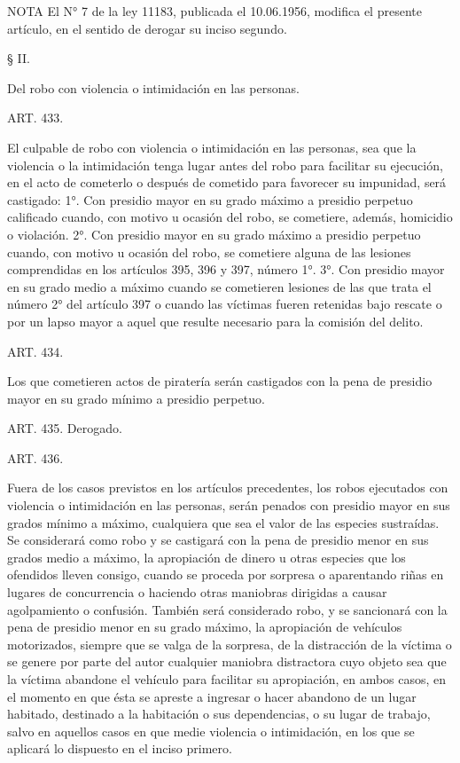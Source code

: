 NOTA
      El N° 7 de la ley 11183, publicada el 10.06.1956, modifica el presente artículo, en el sentido de derogar su inciso segundo.

    § II.

    Del robo con violencia o intimidación en las personas.




    ART. 433.

    El culpable de robo con violencia o intimidación en las personas, sea que la violencia o la intimidación tenga lugar antes del robo para facilitar su ejecución, en el acto de cometerlo o después de cometido para favorecer su impunidad, será castigado:
    1°. Con presidio mayor en su grado máximo a presidio perpetuo calificado cuando, con motivo u ocasión del robo, se cometiere, además, homicidio o violación.
    2°. Con presidio mayor en su grado máximo a presidio perpetuo cuando, con motivo u ocasión del robo, se cometiere alguna de las lesiones comprendidas en los artículos 395, 396 y 397, número 1°.
    3°. Con presidio mayor en su grado medio a máximo cuando se cometieren lesiones de las que trata el número 2° del artículo 397 o cuando las víctimas fueren retenidas bajo rescate o por un lapso mayor a aquel que resulte necesario para la comisión del delito.

    ART. 434.

    Los que cometieren actos de piratería serán castigados con la pena de presidio mayor en su grado mínimo a presidio perpetuo.





    ART. 435.    Derogado.

    ART. 436.

    Fuera de los casos previstos en los artículos precedentes, los robos ejecutados con violencia o intimidación en las personas, serán penados con presidio mayor en sus grados mínimo a máximo, cualquiera que sea el valor de las especies sustraídas.
    Se considerará como robo y se castigará con la pena de presidio menor en sus grados medio a máximo, la apropiación de dinero u otras especies que los ofendidos lleven consigo, cuando se proceda por sorpresa o aparentando riñas en lugares de concurrencia o haciendo otras maniobras dirigidas a causar agolpamiento o confusión.
    También será considerado robo, y se sancionará con la pena de presidio menor en su grado máximo, la apropiación de vehículos motorizados, siempre que se valga de la sorpresa, de la distracción de la víctima o se genere por parte del autor cualquier maniobra distractora cuyo objeto sea que la víctima abandone el vehículo para facilitar su apropiación, en ambos casos, en el momento en que ésta se apreste a ingresar o hacer abandono de un lugar habitado, destinado a la habitación o sus dependencias, o su lugar de trabajo, salvo en aquellos casos en que medie violencia o intimidación, en los que se aplicará lo dispuesto en el inciso primero.



